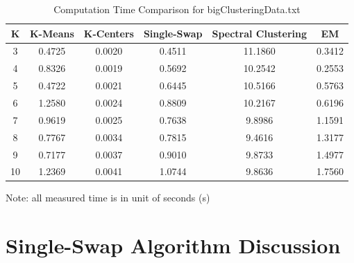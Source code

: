 \begin{table}[H]
	\centering
	\caption{Computation Time Comparison for bigClusteringData.txt}
	\label{table:time_bigClustering}	
	\begin{tabular}{ c | c | c | c | c | c }
		\hline \hline
		K  	&	K-Means     & K-Centers    & Single-Swap    & Spectral Clustering    & EM \\[0.1cm]
		\hline
		3	   &	0.4725     & 0.0020   & 0.4511    & 11.1860    & 0.3412 \\[0.1cm]
		4    &	0.8326     & 0.0019   & 0.5692    & 10.2542    & 0.2553 \\[0.1cm]
		5    &	0.4722     & 0.0021   & 0.6445    & 10.5166    & 0.5763 \\[0.1cm]
		6    &	1.2580     & 0.0024   & 0.8809    & 10.2167    & 0.6196 \\[0.1cm]
		7    &	0.9619     & 0.0025   & 0.7638    & 9.8986      & 1.1591 \\[0.1cm]
		8    &	0.7767     & 0.0034   & 0.7815    & 9.4616      & 1.3177 \\[0.1cm]
		9    &	0.7177     & 0.0037   & 0.9010    & 9.8733      & 1.4977 \\[0.1cm]
		10    &	1.2369     & 0.0041   & 1.0744    & 9.8636      & 1.7560 \\[0.1cm]
		\hline	
	\end{tabular}
\end{table}
{\centering Note: all measured time is in unit of seconds (s)}

\section{\Large Single-Swap Algorithm Discussion}



\clearpage

%
%
%



